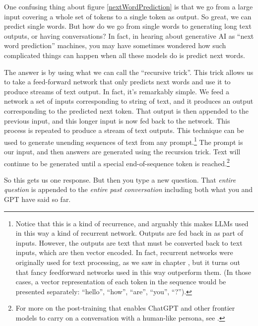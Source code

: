 One confusing thing about figure \ref{nextWordPrediction} is that we go from a
large input covering a whole set of tokens to a single token as output. So
great, we can predict single words. But how do we go from single words to
generating long text outputs, or having conversations? In fact, in hearing
about generative AI as ``next word prediction'' machines, you may have
sometimes wondered how such complicated things can happen when all these models
do is predict next words.

The answer is by using what we can call the ``recursive trick''. This trick
allows us to take a feed-forward network that only predicts next words and use
it to produce streams of text output. In fact, it's remarkably simple. We feed
a network a set of inputs corresponding to string of text, and it produces an
output corresponding to the predicted next token. That output is then appended
to the previous input, and this longer input is now fed back to the network.
This process is repeated to produce a stream of text outputs. This technique
can be used to generate unending sequences of text from any
prompt.\footnote{Notice that this is a kind of recurrence, and arguably this
makes LLMs used in this way a kind of recurrent network. Outputs are fed back
in as part of inputs. However, the outputs are text that must be converted back
to text inputs, which are then vector encoded. In fact, recurrent networks were
originally used for text processing, as we saw in chapter
, but it turns out that fancy feedforward
networks used in this way outperform them. (In those cases, a vector
representation of each token in the sequence would be presented separately:
``hello'', ``how'', ``are'', ``you'', ``?'').} The prompt is our input, and
then answers are generated using the recursion trick. Text will continue to be
generated until a special end-of-sequence token is reached.\footnote{For more
on the post-training that enables ChatGPT and other frontier models to carry on
a conversation with a human-like persona, see .}

So this gets us one response. But then you type a new question. That
\emph{entire question} is appended to the \emph{entire past conversation}
including both what you and GPT have said so far.

